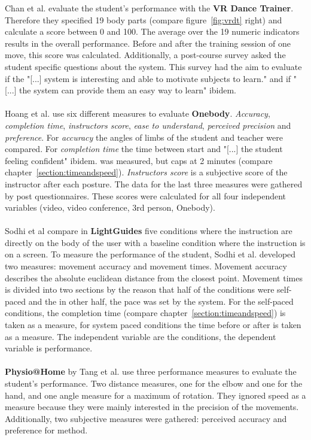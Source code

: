 Chan et al. evaluate the student's performance with the \textbf{VR Dance Trainer}. Therefore they specified 19 body parts (compare figure~\ref{fig:vrdt} right) and calculate a score between 0 and 100. The average over the 19 numeric indicators results in the overall performance. Before and after the training session of one move, this score was calculated. Additionally, a post-course survey asked the student specific questions about the system. This survey had the aim to evaluate if the "[...] system is interesting and able to motivate subjects to learn." \cite{Chan2010} and if "[...] the system can provide them an easy way to learn" ibidem.\\ \\
Hoang et al. \cite{Hoang2016} use six different measures to evaluate \textbf{Onebody}. \textit{Accuracy}, \textit{completion time}, \textit{instructors score}, \textit{ease to understand}, \textit{perceived precision} and \textit{preference}. For \textit{accuracy} the angles of limbs of the student and teacher were compared. For \textit{completion time} the time between start and "[...] the student feeling confident" ibidem. was measured, but caps at 2 minutes (compare chapter~\ref{section:timeandspeed}). \textit{Instructors score} is a subjective score of the instructor after each posture. The data for the last three measures were gathered by post questionnaires. These scores were calculated for all four independent variables (video, video conference, 3rd person, Onebody).
\\ \\
Sodhi et al \cite{Sodhi2012} compare in \textbf{LightGuides} five conditions where the instruction are directly on the body of the user with a baseline condition where the instruction is on a screen. To measure the performance of the student, Sodhi et al. developed two measures: movement accuracy and movement times. Movement accuracy describes the absolute euclidean distance from the closest point. Movement times is divided into two sections by the reason that half of the conditions were self-paced and the in other half, the pace was set by the system. For the self-paced conditions, the completion time (compare chapter~\ref{section:timeandspeed}) is taken as a measure, for system paced conditions the time before or after is taken as a measure. The independent variable are the conditions, the dependent variable is performance.\\ \\
\textbf{Physio@Home} by Tang et al. \cite{Tang2015} use three performance measures to evaluate the student's performance. Two distance measures, one for the elbow and one for the hand, and one angle measure for a maximum of rotation. They ignored speed as a measure because they were mainly interested in the precision of the movements. Additionally, two subjective measures were gathered: perceived accuracy and preference for method.

